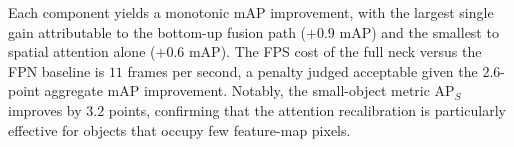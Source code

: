 Each component yields a monotonic mAP improvement, with the
largest single gain attributable to the bottom-up fusion path
($+0.9$ mAP) and the smallest to spatial attention alone
($+0.6$ mAP).  The FPS cost of the full neck versus the FPN
baseline is $11$ frames per second, a penalty judged acceptable
given the $2.6$-point aggregate mAP improvement.  Notably, the
small-object metric $\text{AP}_S$ improves by $3.2$ points,
confirming that the attention recalibration is particularly
effective for objects that occupy few feature-map pixels.
